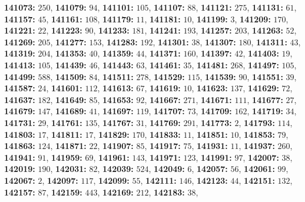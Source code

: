 \textsf{\bfseries 141073:} $250$, \textsf{\bfseries 141079:} $94$, \textsf{\bfseries 141101:} $105$, \textsf{\bfseries 141107:} $88$, \textsf{\bfseries 141121:} $275$, \textsf{\bfseries 141131:} $61$, \textsf{\bfseries 141157:} $45$, \textsf{\bfseries 141161:} $108$, \textsf{\bfseries 141179:} $11$, \textsf{\bfseries 141181:} $10$, \textsf{\bfseries 141199:} $3$, \textsf{\bfseries 141209:} $170$, \textsf{\bfseries 141221:} $22$, \textsf{\bfseries 141223:} $90$, \textsf{\bfseries 141233:} $181$, \textsf{\bfseries 141241:} $193$, \textsf{\bfseries 141257:} $203$, \textsf{\bfseries 141263:} $52$, \textsf{\bfseries 141269:} $205$, \textsf{\bfseries 141277:} $153$, \textsf{\bfseries 141283:} $192$, \textsf{\bfseries 141301:} $38$, \textsf{\bfseries 141307:} $180$, \textsf{\bfseries 141311:} $43$, \textsf{\bfseries 141319:} $204$, \textsf{\bfseries 141353:} $40$, \textsf{\bfseries 141359:} $44$, \textsf{\bfseries 141371:} $160$, \textsf{\bfseries 141397:} $42$, \textsf{\bfseries 141403:} $19$, \textsf{\bfseries 141413:} $105$, \textsf{\bfseries 141439:} $46$, \textsf{\bfseries 141443:} $63$, \textsf{\bfseries 141461:} $35$, \textsf{\bfseries 141481:} $268$, \textsf{\bfseries 141497:} $105$, \textsf{\bfseries 141499:} $588$, \textsf{\bfseries 141509:} $84$, \textsf{\bfseries 141511:} $278$, \textsf{\bfseries 141529:} $115$, \textsf{\bfseries 141539:} $90$, \textsf{\bfseries 141551:} $39$, \textsf{\bfseries 141587:} $24$, \textsf{\bfseries 141601:} $112$, \textsf{\bfseries 141613:} $67$, \textsf{\bfseries 141619:} $10$, \textsf{\bfseries 141623:} $137$, \textsf{\bfseries 141629:} $72$, \textsf{\bfseries 141637:} $182$, \textsf{\bfseries 141649:} $85$, \textsf{\bfseries 141653:} $92$, \textsf{\bfseries 141667:} $271$, \textsf{\bfseries 141671:} $111$, \textsf{\bfseries 141677:} $27$, \textsf{\bfseries 141679:} $147$, \textsf{\bfseries 141689:} $41$, \textsf{\bfseries 141697:} $119$, \textsf{\bfseries 141707:} $73$, \textsf{\bfseries 141709:} $162$, \textsf{\bfseries 141719:} $34$, \textsf{\bfseries 141731:} $29$, \textsf{\bfseries 141761:} $135$, \textsf{\bfseries 141767:} $31$, \textsf{\bfseries 141769:} $291$, \textsf{\bfseries 141773:} $2$, \textsf{\bfseries 141793:} $114$, \textsf{\bfseries 141803:} $17$, \textsf{\bfseries 141811:} $17$, \textsf{\bfseries 141829:} $170$, \textsf{\bfseries 141833:} $11$, \textsf{\bfseries 141851:} $10$, \textsf{\bfseries 141853:} $79$, \textsf{\bfseries 141863:} $124$, \textsf{\bfseries 141871:} $22$, \textsf{\bfseries 141907:} $85$, \textsf{\bfseries 141917:} $75$, \textsf{\bfseries 141931:} $11$, \textsf{\bfseries 141937:} $260$, \textsf{\bfseries 141941:} $91$, \textsf{\bfseries 141959:} $69$, \textsf{\bfseries 141961:} $143$, \textsf{\bfseries 141971:} $123$, \textsf{\bfseries 141991:} $97$, \textsf{\bfseries 142007:} $38$, \textsf{\bfseries 142019:} $190$, \textsf{\bfseries 142031:} $82$, \textsf{\bfseries 142039:} $524$, \textsf{\bfseries 142049:} $6$, \textsf{\bfseries 142057:} $56$, \textsf{\bfseries 142061:} $99$, \textsf{\bfseries 142067:} $2$, \textsf{\bfseries 142097:} $117$, \textsf{\bfseries 142099:} $55$, \textsf{\bfseries 142111:} $146$, \textsf{\bfseries 142123:} $44$, \textsf{\bfseries 142151:} $132$, \textsf{\bfseries 142157:} $87$, \textsf{\bfseries 142159:} $443$, \textsf{\bfseries 142169:} $212$, \textsf{\bfseries 142183:} $38$, 
